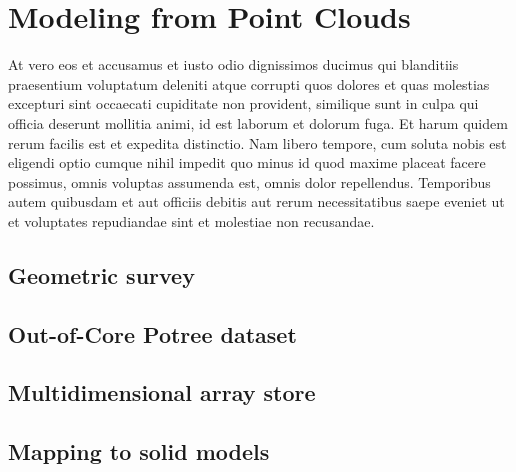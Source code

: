 \chapter{Modeling from Point Clouds}\label{chapt:11}

At vero eos et accusamus et iusto odio dignissimos ducimus qui blanditiis praesentium voluptatum deleniti atque corrupti quos dolores et quas molestias excepturi sint occaecati cupiditate non provident, similique sunt in culpa qui officia deserunt mollitia animi, id est laborum et dolorum fuga. Et harum quidem rerum facilis est et expedita distinctio. Nam libero tempore, cum soluta nobis est eligendi optio cumque nihil impedit quo minus id quod maxime placeat facere possimus, omnis voluptas assumenda est, omnis dolor repellendus. Temporibus autem quibusdam et aut officiis debitis aut rerum necessitatibus saepe eveniet ut et voluptates repudiandae sint et molestiae non recusandae. 

\section{ Geometric survey}\label{sect:11-1}


\section{ Out-of-Core Potree dataset}\label{sect:11-2}


\section{ Multidimensional array store}\label{sect:11-3}


\section{ Mapping to solid models}\label{sect:11-4}